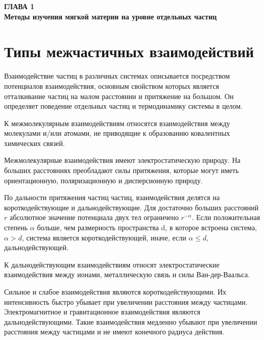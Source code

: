 
\newpage
\begin{center}
\textbf{ГЛАВА 1}\\
\textbf{Методы изучения мягкой материи на уровне отдельных частиц}
\end{center}




\section{Типы межчастичных взаимодействий}\label{C1_1}

 Взаимодействие частиц в различных системах описывается посредством потенциалов взаимодействия, основным свойством которых является отталкивание частиц на малом расстоянии и притяжение на большом. Он определяет поведение отдельных частиц и термодинамику системы в целом.
 
 К межмолекулярным взаимодействиям относятся взаимодействия между молекулами и/или атомами, не приводящие к образованию ковалентных химических связей.

Межмолекулярные взаимодействия имеют электростатическую природу. На больших расстояниях преобладают силы притяжения, которые могут иметь ориентационную, поляризационную и дисперсионную природу.

По дальности притяжения частиц частиц, взаимодействия делятся на короткодействующие и дальнодействующие. Для достаточно больших расстояний $r$ абсолютное значение потенциала двух тел ограничено $r^{-\alpha}$. Если положительная степень $\alpha$ больше, чем размерность пространства d, в которое встроена система, $\alpha>d$, система является короткодействующей, иначе, если $\alpha \leq d$, дальнодействующей.

К дальнодействующим взаимодействиям относят электростатические взаимодействия между ионами, металлическую связь и силы Ван-дер-Ваальса. 

Сильное и слабое взаимодействия являются короткодействующими. Их интенсивность быстро убывает при увеличении расстояния между частицами.  Электромагнитное и гравитационное взаимодействия являются дальнодействующими. Такие взаимодействия медленно убывают при увеличении расстояния между частицами и не имеют конечного радиуса действия.

